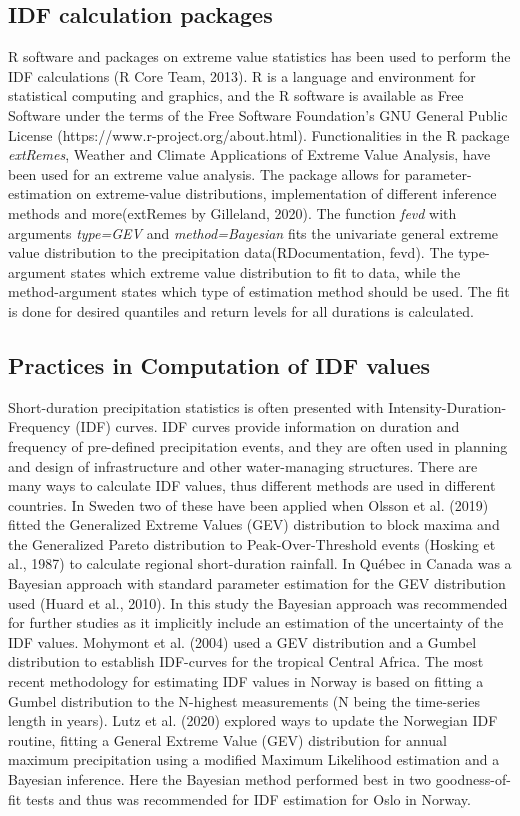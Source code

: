 \subsection{IDF calculation packages}

R software and packages on extreme value statistics has been used to perform the IDF calculations (R Core Team, 2013). R is a language and environment for statistical computing and graphics, and the R software is available as Free Software under the terms of the Free Software Foundation's GNU General Public License (https://www.r-project.org/about.html). Functionalities in the R package \textit{extRemes}, Weather and Climate Applications of Extreme Value Analysis, have been used for an extreme value analysis. The package allows for parameter-estimation on extreme-value distributions, implementation of different inference methods and more(extRemes by Gilleland, 2020). The function \textit{fevd} with arguments \textit{type=GEV} and \textit{method=Bayesian} fits the univariate general extreme value distribution to the precipitation data(RDocumentation, fevd). The type-argument states which extreme value distribution to fit to data, while the method-argument states which type of estimation method should be used. The fit is done for desired quantiles and return levels for all durations is calculated.  

 

\subsection{Practices in Computation of IDF values}

Short-duration precipitation statistics is often presented with Intensity-Duration-Frequency (IDF) curves. IDF curves provide information on duration and frequency of pre-defined precipitation events, and they are often used in planning and design of infrastructure and other water-managing structures. There are many ways to calculate IDF values, thus different methods are used in different countries. In Sweden two of these have been applied when Olsson et al. (2019) fitted the Generalized Extreme Values (GEV) distribution to block maxima and the Generalized Pareto distribution to Peak-Over-Threshold events (Hosking et al., 1987) to calculate regional short-duration rainfall. In Québec in Canada was a Bayesian approach with standard parameter estimation for the GEV distribution used (Huard et al., 2010). In this study the Bayesian approach was recommended for further studies as it implicitly include an estimation of the uncertainty of the IDF values. Mohymont et al. (2004) used a GEV distribution and a Gumbel distribution to establish IDF-curves for the tropical Central Africa. The most recent methodology for estimating IDF values in Norway is based on fitting a Gumbel distribution to the N-highest measurements (N being the time-series length in years). Lutz et al. (2020) explored ways to update the Norwegian IDF routine, fitting a General Extreme Value (GEV) distribution for annual maximum precipitation using a modified Maximum Likelihood estimation and a Bayesian inference. Here the Bayesian method performed best in two goodness-of-fit tests and thus was recommended for IDF estimation for Oslo in Norway.

